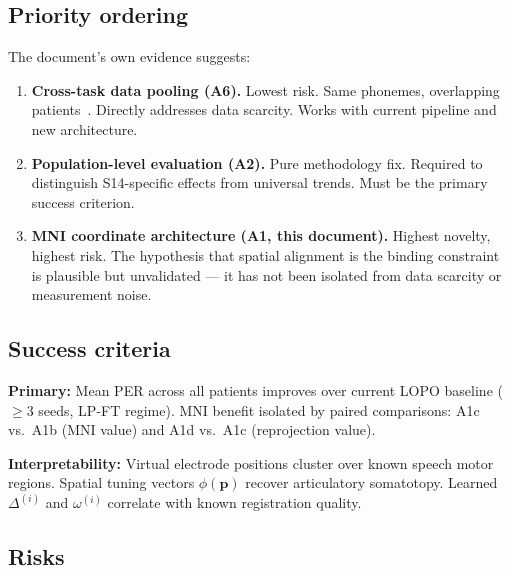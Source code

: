 \documentclass[11pt,letterpaper]{article}
\newcommand{\bfp}{\mathbf{p}}
\begin{document}
\subsection{Priority ordering}

The document's own evidence suggests:

\begin{enumerate}[leftmargin=2em]
\item \textbf{Cross-task data pooling (A6).} Lowest risk. Same phonemes, overlapping patients~\cite{duraivel2025}. Directly addresses data scarcity. Works with current pipeline and new architecture.

\item \textbf{Population-level evaluation (A2).} Pure methodology fix. Required to distinguish S14-specific effects from universal trends. Must be the primary success criterion.

\item \textbf{MNI coordinate architecture (A1, this document).} Highest novelty, highest risk. The hypothesis that spatial alignment is the binding constraint is plausible but unvalidated --- it has not been isolated from data scarcity or measurement noise.
\end{enumerate}

\subsection{Success criteria}

\textbf{Primary:} Mean PER across all patients improves over current LOPO baseline ($\geq 3$ seeds, LP-FT regime). MNI benefit isolated by paired comparisons: A1c vs.\ A1b (MNI value) and A1d vs.\ A1c (reprojection value).

\textbf{Interpretability:} Virtual electrode positions cluster over known speech motor regions. Spatial tuning vectors $\phi(\bfp)$ recover articulatory somatotopy. Learned $\Delta^{(i)}$ and $\omega^{(i)}$ correlate with known registration quality.

\subsection{Risks}
\end{document}
